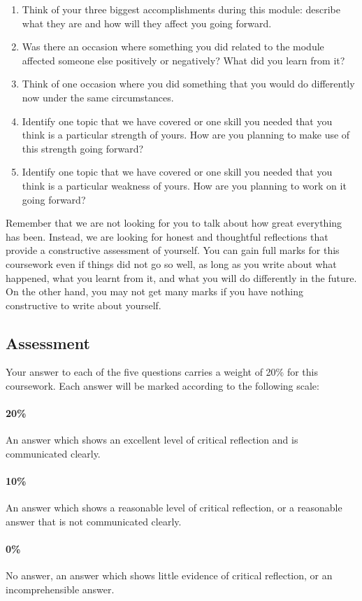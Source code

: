 \begin{enumerate}
    \item Think of your three biggest accomplishments during this module: describe what they are and how will they affect you going forward.
    \item Was there an occasion where something you did related to the module affected someone else positively or negatively? What did you learn from it?
    \item Think of one occasion where you did something that you would do differently now under the same circumstances.
    \item Identify one topic that we have covered or one skill you needed that you think is a particular strength of yours. How are you planning to make use of this strength going forward?
    \item Identify one topic that we have covered or one skill you needed that you think is a particular weakness of yours. How are you planning to work on it going forward?
\end{enumerate}

Remember that we are not looking for you to talk about how great everything has been. Instead, we are looking for honest and thoughtful reflections that provide a constructive assessment of yourself. You can gain full marks for this coursework even if things did not go so well, as long as you write about what happened, what you learnt from it, and what you will do differently in the future. On the other hand, you may not get many marks if you have nothing constructive to write about yourself.

\subsection{Assessment}

Your answer to each of the five questions carries a weight of 20\% for this coursework. Each answer will be marked according to the following scale:

\paragraph{20\%} An answer which shows an excellent level of critical reflection and is communicated clearly.

\paragraph{10\%} An answer which shows a reasonable level of critical reflection, or a reasonable answer that is not communicated clearly.

\paragraph{0\%} No answer, an answer which shows little evidence of critical reflection, or an incomprehensible answer.
